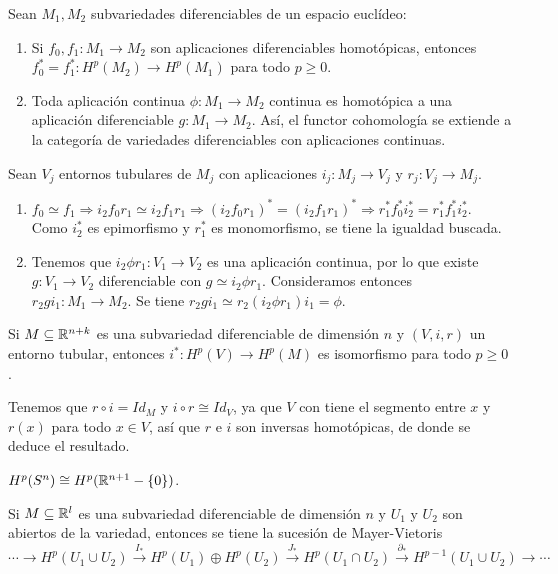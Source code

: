 \documentclass[CV.tex]{subfiles}
\begin{document}
\begin{prop}
Sean $M_1,M_2$ subvariedades diferenciables de un espacio euclídeo:
\begin{enumerate}
\item Si $f_0,f_1:M_1\to M_2$ son aplicaciones diferenciables homotópicas, entonces $f_0^*=f_1^*:H^p(M_2)\to H^p(M_1)$ para todo $p\geq 0$.
\item Toda aplicación continua $\phi:M_1\to M_2$ continua es homotópica a una aplicación diferenciable $g:M_1\to M_2$. Así, el functor cohomología se extiende a la categoría de variedades diferenciables con aplicaciones continuas.
\end{enumerate}
\end{prop}
\begin{dem}
Sean $V_j$ entornos tubulares de $M_j$ con aplicaciones $i_j:M_j\to V_j $ y $r_j:V_j\to M_j$.
\begin{enumerate}
\item $f_0\simeq f_1\Rightarrow i_2f_0r_1\simeq i_2f_1r_1\Rightarrow (i_2f_0r_1)^*=(i_2f_1r_1)^*\Rightarrow r_1^*f_0^*i_2^*=r_1^*f_1^*i_2^*$. Como $i_2^*$ es epimorfismo y $r_1^*$ es monomorfismo, se tiene la igualdad buscada.
\item Tenemos que $i_2\phi r_1:V_1\to V_2$ es una aplicación continua, por lo que existe $g:V_1\to V_2$ diferenciable con $g\simeq i_2\phi r_1$. Consideramos entonces $r_2gi_1:M_1\to M_2$. Se tiene $r_2gi_1\simeq r_2(i_2\phi r_1)i_1=\phi$. 
\end{enumerate}
\QED
\end{dem}

\begin{coro}
Si $M\subseteq\mathbb{R}^{n+k}$ es una subvariedad diferenciable de dimensión $n$ y $(V,i,r)$ un entorno tubular, entonces $i^*:H^p(V)\to H^p(M)$ es isomorfismo para todo $p\geq 0$.
\end{coro}
\begin{dem}
Tenemos que $r\circ i=Id_M$ y $i\circ r\cong Id_V$, ya que $V$ con tiene el segmento entre $x$ y $r(x)$ para todo $x\in V$, así que $r$ e $i$ son inversas homotópicas, de donde se deduce el resultado. \QED
\end{dem}

\begin{ej}
$H^p(S^n)\cong H^p(\mathbb{R}^{n+1}-\{0\})$. 
\end{ej}

\begin{nota}
Si $M\subseteq\mathbb{R}^l$ es una subvariedad diferenciable de dimensión $n$ y $U_1$ y $U_2$ son abiertos de la variedad, entonces se tiene la sucesión de Mayer-Vietoris
\[
\cdots\to H^p(U_1\cup U_2)\xrightarrow{I_*}H^p(U_1)\oplus H^p(U_2)\xrightarrow{J_*}H^p(U_1\cap U_2)\xrightarrow{\partial_*}H^{p-1}(U_1\cup U_2)\to\cdots 
\]
\end{nota}
\end{document}
